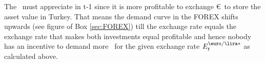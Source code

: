 {{		\item The \lira\ must appreciate in t-1 since it is more profitable to exchange \euro\ to store the asset value in Turkey. That means the demand curve in the FOREX shifts upwards (see figure of Box \ref{sec:FOREX}) till the exchange rate equals the exchange rate that makes both investments equal profitable and hence nobody has an incentive to demand more \lira\ for the given exchange rate $E^{\euro/\lira*}_{t}$ as calculated above.
	}
}





%
%

